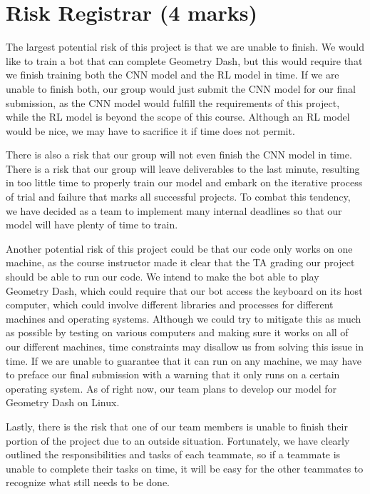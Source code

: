 \documentclass{article} %
\begin{document}
\section{Risk Registrar (4 marks)}
The largest potential risk of this project is that we are unable to 
finish. We would like to train a bot that can complete Geometry Dash, 
but this would require that we finish training both the CNN model and 
the RL model in time. If we are unable to finish both, our group would 
just submit the CNN model for our final submission, as the CNN model 
would fulfill the requirements of this project, while the RL model is 
beyond the scope of this course. Although an RL model would be nice, 
we may have to sacrifice it if time does not permit. 

There is also a risk that our group will not even finish the CNN model 
in time. There is a risk that our group will leave deliverables to the 
last minute, resulting in too little time to properly train our model 
and embark on the iterative process of trial and failure that marks all
successful projects. To combat this tendency, we have decided as a team 
to implement many internal deadlines so that our model will have plenty 
of time to train.

Another potential risk of this project could be that our code only works
on one machine, as the course instructor made it clear that the TA grading
our project should be able to run our code. We intend to make the bot 
able to play Geometry Dash, which could require that our bot access the 
keyboard on its host computer, which could involve different libraries 
and processes for different machines and operating systems. Although 
we could try to mitigate this as much as possible by testing on various 
computers and making sure it works on all of our different machines, time
constraints may disallow us from solving this issue in time. If we are 
unable to guarantee that it can run on any machine, we may have to preface 
our final submission with a warning that it only runs on a certain 
operating system. As of right now, our team plans to develop our model 
for Geometry Dash on Linux. 

Lastly, there is the risk that one of our team members is unable to finish
their portion of the project due to an outside situation. Fortunately, 
we have clearly outlined the responsibilities and tasks of each teammate, 
so if a teammate is unable to complete their tasks on time, it will be 
easy for the other teammates to recognize what still needs to be done.
\end{document}
